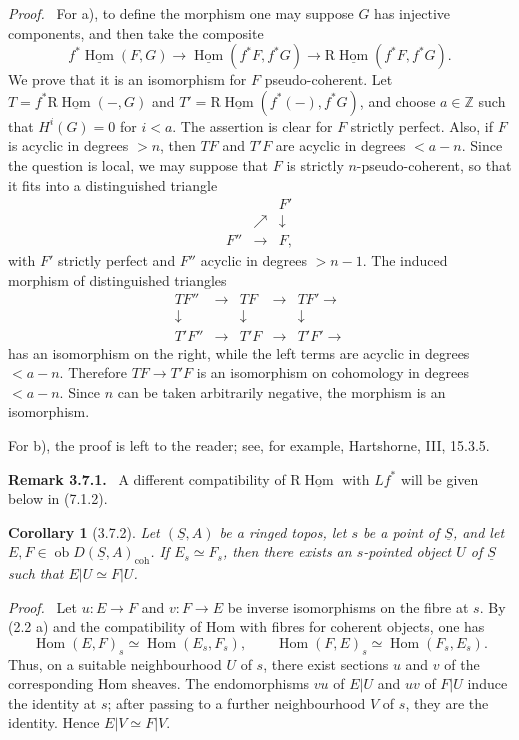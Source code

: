 \documentclass[13pt]{extarticle}
\newcommand{\ZZ}{\mathbb Z}
\newcommand{\uS}{\underline S}
\newcommand{\ob}{\operatorname{ob}}
\newcommand{\Hom}{\operatorname{Hom}}
\newcommand{\RHom}{\mathrm R\underline{\operatorname{Hom}}}
\newenvironment{prooftext}[1][Proof]{\par\noindent\emph{#1.}\ }{\par\medskip}
\newenvironment{remarktext}[1][Remark]{\par\noindent\textbf{#1.}\ }{\par\medskip}
\newtheorem*{corollary*}{Corollary}
\begin{document}
\begin{prooftext}
For a), to define the morphism one may suppose $G$ has injective components, and then take the composite
\[
f^*\underline{\Hom}(F,G)\longrightarrow
\underline{\Hom}(f^*F,f^*G)\longrightarrow
\RHom(f^*F,f^*G).
\]
We prove that it is an isomorphism for $F$ pseudo-coherent. Let $T=f^*\RHom(-,G)$ and $T'=\RHom(f^*(-),f^*G)$, and choose $a\in\ZZ$ such that $H^i(G)=0$ for $i<a$. The assertion is clear for $F$ strictly perfect. Also, if $F$ is acyclic in degrees $>n$, then $TF$ and $T'F$ are acyclic in degrees $<a-n$. Since the question is local, we may suppose that $F$ is strictly $n$-pseudo-coherent, so that it fits into a distinguished triangle
\[
\begin{array}{ccc}
&&F'\\
&\nearrow&\downarrow\\
F''&\longrightarrow&F,
\end{array}
\]
with $F'$ strictly perfect and $F''$ acyclic in degrees $>n-1$. The induced morphism of distinguished triangles
\[
\begin{array}{ccccc}
TF''&\longrightarrow&TF&\longrightarrow&TF'\longrightarrow\\
\downarrow&&\downarrow&&\downarrow\\
T'F''&\longrightarrow&T'F&\longrightarrow&T'F'\longrightarrow
\end{array}
\]
has an isomorphism on the right, while the left terms are acyclic in degrees $<a-n$. Therefore $TF\to T'F$ is an isomorphism on cohomology in degrees $<a-n$. Since $n$ can be taken arbitrarily negative, the morphism is an isomorphism.

For b), the proof is left to the reader; see, for example, Hartshorne, III, 15.3.5.
\end{prooftext}

\begin{remarktext}[Remark 3.7.1]
A different compatibility of $\RHom$ with $Lf^*$ will be given below in (7.1.2).
\end{remarktext}

\begin{corollary*}[3.7.2]
Let $(\uS,A)$ be a ringed topos, let $s$ be a point of $\uS$, and let $E,F\in\ob D(\uS,A)_{\mathrm{coh}}$. If $E_s\simeq F_s$, then there exists an $s$-pointed object $U$ of $\uS$ such that $E|U\simeq F|U$.
\end{corollary*}

\begin{prooftext}
Let $u:E\to F$ and $v:F\to E$ be inverse isomorphisms on the fibre at $s$. By (2.2 a) and the compatibility of Hom with fibres for coherent objects, one has
\[
\Hom(E,F)_s\simeq\Hom(E_s,F_s),\qquad
\Hom(F,E)_s\simeq\Hom(F_s,E_s).
\]
Thus, on a suitable neighbourhood $U$ of $s$, there exist sections $u$ and $v$ of the corresponding Hom sheaves. The endomorphisms $vu$ of $E|U$ and $uv$ of $F|U$ induce the identity at $s$; after passing to a further neighbourhood $V$ of $s$, they are the identity. Hence $E|V\simeq F|V$.
\end{prooftext}
\end{document}
